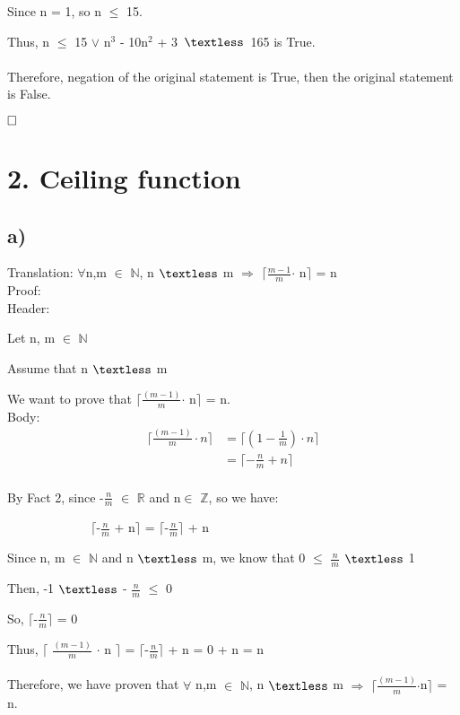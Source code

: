 \documentclass[12pt]{article}
\begin{document}
Since n = 1, so n $\leq$ 15.

Thus, n $\leq$ 15 $\vee$ n$^3$ - 10n$^2$ + 3\ $\textless$\ 165 is True. \\
~\\
Therefore, negation of the original statement is True, then the original statement is False.

$\hfill\square$ 

\vspace{20pt}

\section*{2. Ceiling function}
\subsection*{a)}
Translation: $\forall$n,m $\in$ $\mathbb{N}$, n $\textless$ m $\Rightarrow$ $\lceil$$\frac{m-1}{m}$$\cdot$ n$\rceil$ = n \\
Proof:\\
Header:

Let n, m $\in$ $\mathbb{N}$

Assume that n $\textless$ m

We want to prove that $\lceil$$\frac{(m-1)}{m}$$\cdot$ n$\rceil$ = n. \\
Body:
\begin{align*}
\lceil \frac{(m-1)}{m} \cdot n \rceil  &= \lceil (1 - \frac{1}{m})\cdot n\rceil  \\
&=\lceil - \frac{n}{m} + n\rceil \\
\end{align*}

By Fact 2, since -$\frac{n}{m}$ $\in$ $\mathbb{R}$ and n$\in$ $\mathbb{Z}$, so we have:

$\quad$ $\quad$ $\quad$ $\quad$ $\quad$ $\lceil$-$\frac{n}{m}$ + n$\rceil$ = $\lceil$-$\frac{n}{m}$$\rceil$ + n

Since n, m $\in$ $\mathbb{N}$ and n $\textless$ m, we know that 0 $\leq$ $\frac{n}{m}$ $\textless$ 1

Then, -1 $\textless$ - $\frac{n}{m}$ $\leq$ 0

So, $\lceil$-$\frac{n}{m}$$\rceil$ = 0

Thus, $\lceil$ $\frac{(m-1)}{m}$ $\cdot$ n $\rceil$ = $\lceil$-$\frac{n}{m}$$\rceil$ + n = 0 + n = n\\
~\\
Therefore, we have proven that $\forall$ n,m $\in$ $\mathbb{N}$, n $\textless$ m $\Rightarrow$ $\lceil$$\frac{(m-1)}{m}$$\cdot$n$\rceil$ = n.
\end{document}
